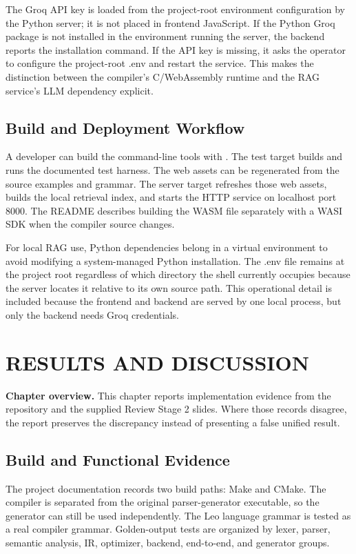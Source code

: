 \documentclass[12pt,a4paper,oneside]{report}
\newcommand{\code}[1]{\texttt{\detokenize{#1}}}
\newcommand{\chapterintro}[1]{\noindent\textbf{Chapter overview.} #1\par\vspace{8pt}}
\begin{document}
The Groq API key is loaded from the project-root environment configuration by the Python server; it is not placed in frontend JavaScript. If the Python Groq package is not installed in the environment running the server, the backend reports the installation command. If the API key is missing, it asks the operator to configure the project-root .env and restart the service. This makes the distinction between the compiler's C/WebAssembly runtime and the RAG service's LLM dependency explicit.

\section{Build and Deployment Workflow}
A developer can build the command-line tools with \code{make}. The test target builds and runs the documented test harness. The web assets can be regenerated from the source examples and grammar. The server target refreshes those web assets, builds the local retrieval index, and starts the HTTP service on localhost port 8000. The README describes building the WASM file separately with a WASI SDK when the compiler source changes.

For local RAG use, Python dependencies belong in a virtual environment to avoid modifying a system-managed Python installation. The .env file remains at the project root regardless of which directory the shell currently occupies because the server locates it relative to its own source path. This operational detail is included because the frontend and backend are served by one local process, but only the backend needs Groq credentials.

\chapter{RESULTS AND DISCUSSION}
\chapterintro{This chapter reports implementation evidence from the repository and the supplied Review Stage 2 slides. Where those records disagree, the report preserves the discrepancy instead of presenting a false unified result.}

\section{Build and Functional Evidence}
The project documentation records two build paths: Make and CMake. The compiler is separated from the original parser-generator executable, so the generator can still be used independently. The Leo language grammar is tested as a real compiler grammar. Golden-output tests are organized by lexer, parser, semantic analysis, IR, optimizer, backend, end-to-end, and generator groups.
\end{document}
